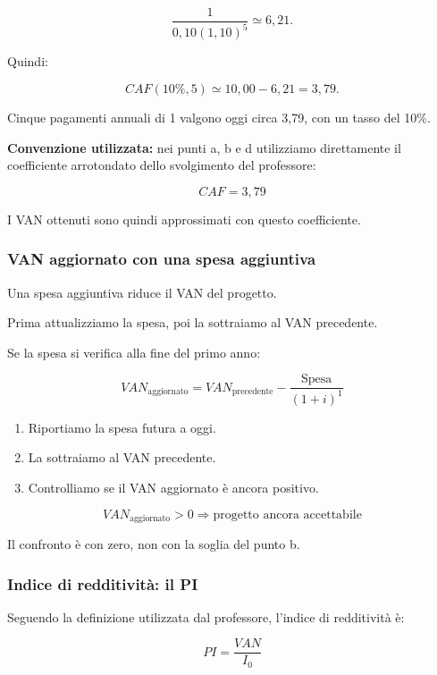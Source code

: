 \[
\frac{1}{0{,}10(1{,}10)^5}
\simeq6{,}21.
\]

\noindent Quindi:

\[
CAF(10\%,5)
\simeq10{,}00-6{,}21
=
\boxed{3{,}79}.
\]

\noindent Cinque pagamenti annuali di 1
valgono oggi circa 3,79,
con un tasso del 10\%.

\medskip

\noindent \textbf{Convenzione utilizzata:}
nei punti a, b e d utilizziamo
direttamente il coefficiente arrotondato
dello svolgimento del professore:

\[
\boxed{CAF=3{,}79}
\]

\noindent I VAN ottenuti sono quindi
approssimati con questo coefficiente.


\subsubsection*{VAN aggiornato con una spesa aggiuntiva}

\noindent Una spesa aggiuntiva
riduce il VAN del progetto.

\noindent Prima attualizziamo la spesa,
poi la sottraiamo al VAN precedente.

\noindent Se la spesa si verifica
alla fine del primo anno:

\[
\boxed{
VAN_{\text{aggiornato}}
=
VAN_{\text{precedente}}
-
\frac{\text{Spesa}}{(1+i)^1}
}
\]

\begin{enumerate}
    \item Riportiamo la spesa futura a oggi.
    \item La sottraiamo al VAN precedente.
    \item Controlliamo se il VAN aggiornato
    è ancora positivo.
\end{enumerate}

\[
\boxed{
VAN_{\text{aggiornato}}>0
\Rightarrow
\text{progetto ancora accettabile}
}
\]

\noindent Il confronto è con zero,
non con la soglia del punto b.


\subsubsection*{Indice di redditività:
il PI}

\noindent Seguendo la definizione
utilizzata dal professore,
l'indice di redditività è:

\[
\boxed{
PI=\frac{VAN}{I_0}
}
\]


